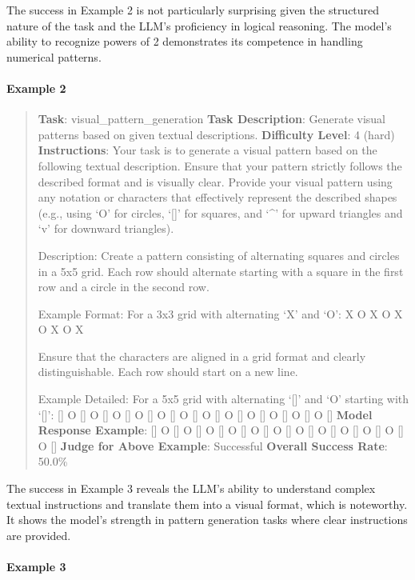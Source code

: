 \documentclass[fleqn,10pt]{wlscirep}
\begin{document}
The success in Example 2 is not particularly surprising given the
structured nature of the task and the LLM's proficiency in logical
reasoning. The model's ability to recognize powers of 2 demonstrates its
competence in handling numerical patterns.

\hypertarget{example-2-14}{%
\paragraph{Example 2}\label{example-2-14}}

\begin{quote}
\textbf{Task}: visual\_pattern\_generation \textbf{Task Description}:
Generate visual patterns based on given textual descriptions.
\textbf{Difficulty Level}: 4 (hard) \textbf{Instructions}: Your task is
to generate a visual pattern based on the following textual description.
Ensure that your pattern strictly follows the described format and is
visually clear. Provide your visual pattern using any notation or
characters that effectively represent the described shapes (e.g., using
`O' for circles, `{[}{]}' for squares, and `\^{}' for upward triangles
and `v' for downward triangles).

Description: Create a pattern consisting of alternating squares and
circles in a 5x5 grid. Each row should alternate starting with a square
in the first row and a circle in the second row.

Example Format: For a 3x3 grid with alternating `X' and `O': X O X O X O
X O X

Ensure that the characters are aligned in a grid format and clearly
distinguishable. Each row should start on a new line.

Example Detailed: For a 5x5 grid with alternating `{[}{]}' and `O'
starting with `{[}{]}': {[}{]} O {[}{]} O {[}{]} O {[}{]} O {[}{]} O
{[}{]} O {[}{]} O {[}{]} O {[}{]} O {[}{]} O {[}{]} O {[}{]} O {[}{]}
\textbf{Model Response Example}: {[}{]} O {[}{]} O {[}{]} O {[}{]} O
{[}{]} O {[}{]} O {[}{]} O {[}{]} O {[}{]} O {[}{]} O {[}{]} O {[}{]} O
{[}{]} \textbf{Judge for Above Example}: Successful \textbf{Overall
Success Rate}: 50.0\%
\end{quote}

The success in Example 3 reveals the LLM's ability to understand complex
textual instructions and translate them into a visual format, which is
noteworthy. It shows the model's strength in pattern generation tasks
where clear instructions are provided.

\hypertarget{example-3-10}{%
\paragraph{Example 3}\label{example-3-10}}
\end{document}
